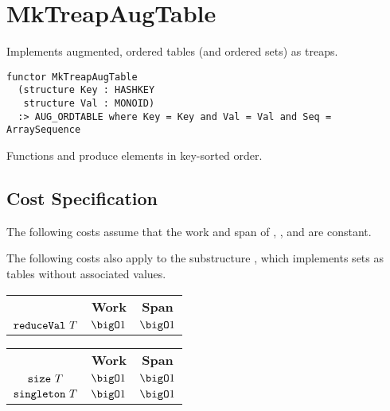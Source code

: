 \chapter{MkTreapAugTable}
\label{ch:treap-aug-table}
\begin{preamble}
Implements augmented, ordered tables (and ordered sets) as treaps.
\begin{verbatim}
functor MkTreapAugTable
  (structure Key : HASHKEY
   structure Val : MONOID)
  :> AUG_ORDTABLE where Key = Key and Val = Val and Seq = ArraySequence
\end{verbatim}
\end{preamble}

\begin{gram}
Functions  and  produce elements in key-sorted order.
\end{gram}

\section{Cost Specification}

\begin{gram}
The following costs assume that the work and span of ,
, and  are constant.
\end{gram}

\begin{gram}
The following costs also apply to the substructure , which implements
sets as tables without associated values.
\end{gram}

\begin{costspec}
\begin{tabular}{c|c|c}
& \textbf{Work} & \textbf{Span} \\
$\texttt{reduceVal}~T$ & $\bigO 1$ & $\bigO 1$
\end{tabular}
\end{costspec}

\begin{costspec}
\begin{tabular}{c|c|c}
& \textbf{Work} & \textbf{Span} \\
$\texttt{size}~T$ & $\bigO 1$ & $\bigO 1$ \\
$\texttt{singleton}~T$ & $\bigO 1$ & $\bigO 1$ \\
\end{tabular}
\end{costspec}

